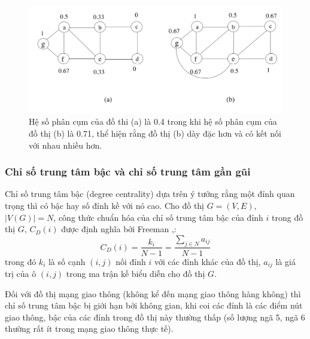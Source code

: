 \documentclass[14pt, oneside, a4paper, openany]{scrartcl}
\begin{document}
\begin{figure}[!h]
	\centering
	\includegraphics[scale=0.5]{figures/clustercoefficient.png} 
	\caption[Hệ số phân cụm]{Hệ số phân cụm của đồ thi (a) là 0.4 trong khi hệ số phân cụm của đồ thị (b) là 0.71, thể hiện rằng đồ thị (b) dày đặc hơn và có kết nối với nhau nhiều hơn.}
	\label{fig:clustercoeff}
\end{figure}



\subsubsection{Chỉ số trung tâm bậc và chỉ số trung tâm gần gũi}
Chỉ số trung tâm bậc (degree centrality) dựa trên ý tưởng rằng một đỉnh quan trọng thì có bậc hay số đỉnh kề với nó cao. Cho đồ thị $G=(V,E)$, $|V(G)| = N$, công thức chuẩn hóa của chỉ số trung tâm bậc của đỉnh $i$ trong đồ thị $G$, $C_D(i)$ được định nghĩa bởi Freeman \cite{centrali01},\cite{centrali02}:
\begin{equation}
	C_D(i) = \frac{k_i}{N-1} = \frac{\sum_{j \in N}a_{ij}}{N-1}
\end{equation}
trong đó $k_i$ là số cạnh $(i,j)$ nối đỉnh $i$ với các đỉnh khác của đồ thị, $a_{ij}$ là giá trị của ô $(i,j)$ trong ma trận kề biểu diễn cho đồ thị $G$.

Đối với đồ thị mạng giao thông (không kể đến mạng giao thông hàng không) thì chỉ số trung tâm bậc bị giới hạn bởi không gian, khi coi các đỉnh là các điểm nút giao thông, bậc của các đỉnh trong đồ thị này thường thấp (số lượng ngã 5, ngã 6 thường rất ít trong mạng giao thông thực tế).
\end{document}
